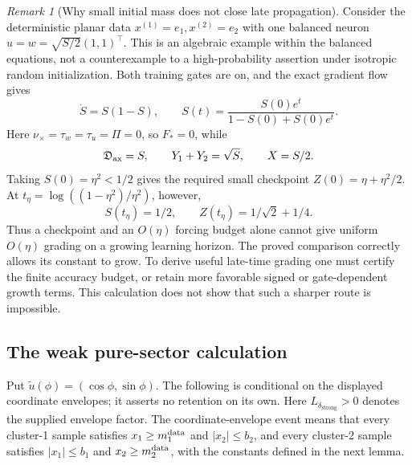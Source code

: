 \documentclass{article} %
\theoremstyle{plain}
\theoremstyle{definition}
\theoremstyle{remark}
\newtheorem{remark}[theorem]{Remark}
\begin{document}
\begin{remark}[Why small initial mass does not close late propagation]
\label{sbagg:small-mass-example}
Consider the deterministic planar data $x^{(1)}=e_1,x^{(2)}=e_2$ with
one balanced neuron $u=w=\sqrt{S/2}(1,1)^\top$. This is an algebraic
example within the balanced equations, not a counterexample to a
high-probability assertion under isotropic random initialization.
Both training gates are on, and the exact gradient flow gives
\[
 \dot S=S(1-S),\qquad
 S(t)=\frac{S(0)e^t}{1-S(0)+S(0)e^t}.
\]
Here $\nu_\times=\tau_w=\tau_u=\Pi=0$, so $F_*=0$, while
\[
 \mathfrak D_{\rm ax}=S,\qquad Y_1+Y_2=\sqrt S,\qquad X=S/2.
\]
Taking $S(0)=\eta^2<1/2$ gives the required small checkpoint
$Z(0)=\eta+\eta^2/2$. At
$t_\eta=\log((1-\eta^2)/\eta^2)$, however,
\[
 S(t_\eta)=1/2,\qquad Z(t_\eta)=1/\sqrt2+1/4.
\]
Thus a checkpoint and an $O(\eta)$ forcing budget alone cannot give
uniform $O(\eta)$ grading on a growing learning horizon.
The proved comparison correctly allows its constant to grow.
To derive useful late-time grading one must certify the finite accuracy
budget, or retain more favorable signed or gate-dependent growth terms.
This calculation does not show that such a sharper route is impossible.
\end{remark}

\subsection{The weak pure-sector calculation}
Put $\widetilde u(\phi)=(\cos\phi,\sin\phi)$. The following is conditional
on the displayed coordinate envelopes; it asserts no retention on its own.
Here $L_{\delta_{\mathrm{strong}}}>0$ denotes the supplied envelope factor.
The coordinate-envelope event means that every cluster-1 sample satisfies
$x_1\ge m_1^{\rm data}$ and $|x_2|\le b_2$, and every cluster-2 sample
satisfies $|x_1|\le b_1$ and $x_2\ge m_2^{\rm data}$, with the constants
defined in the next lemma.
\end{document}
